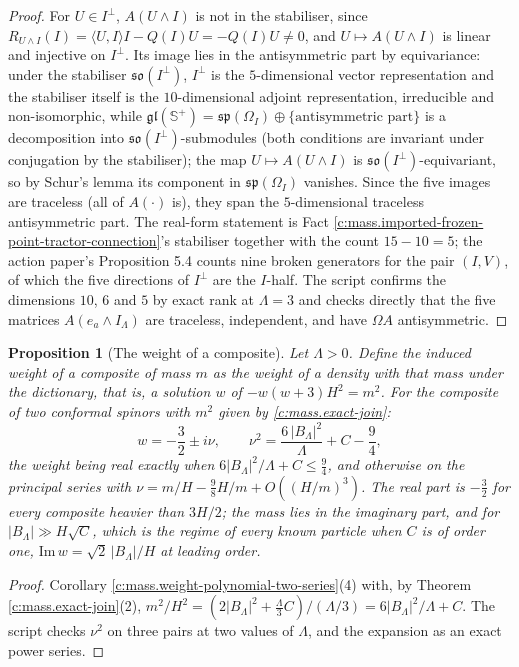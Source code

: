 \documentclass[11pt]{article}
\newtheorem{proposition}[theorem]{Proposition}
\theoremstyle{definition}
\theoremstyle{plain}
\newcommand{\changedmark}[2]{\marginpar{\raggedright\scriptsize\color{#1}#2}}
\providecommand{\CS}{}\renewcommand{\CS}{{\mathbb{S}^{+}}}
\providecommand{\ip}{}\renewcommand{\ip}[2]{\langle #1, #2\rangle}
\begin{document}
\begin{proof}
For $U \in I^{\perp}$, $A(U\wedge I)$ is not in the stabiliser, since $R_{U\wedge I}(I) = \ip{U}{I}I - Q(I)U = -Q(I)U \neq 0$, and $U \mapsto A(U\wedge I)$ is linear and injective on $I^{\perp}$. Its image lies in the antisymmetric part by equivariance: under the stabiliser $\mathfrak{so}(I^{\perp})$, $I^{\perp}$ is the $5$-dimensional vector representation and the stabiliser itself is the $10$-dimensional adjoint representation, irreducible and non-isomorphic, while $\mathfrak{gl}(\CS) = \mathfrak{sp}(\Omega_{I}) \oplus \{\text{antisymmetric part}\}$ is a decomposition into $\mathfrak{so}(I^{\perp})$-submodules (both conditions are invariant under conjugation by the stabiliser); the map $U \mapsto A(U\wedge I)$ is $\mathfrak{so}(I^{\perp})$-equivariant, so by Schur's lemma its component in $\mathfrak{sp}(\Omega_{I})$ vanishes. Since the five images are traceless (all of $A(\cdot)$ is), they span the $5$-dimensional traceless antisymmetric part. The real-form statement is Fact \ref{c:mass.imported-frozen-point-tractor-connection}'s stabiliser together with the count $15 - 10 = 5$; the action paper's Proposition 5.4 counts nine broken generators for the pair $(I, V)$, of which the five directions of $I^{\perp}$ are the $I$-half. The script confirms the dimensions $10$, $6$ and $5$ by exact rank at $\Lambda = 3$ and checks directly that the five matrices $A(e_{a}\wedge I_{\Lambda})$ are traceless, independent, and have $\Omega A$ antisymmetric.

\end{proof}

\begin{proposition}[The weight of a composite]\label{c:mass.weight-composite}
\changedmark{gray}{reworded}
Let $\Lambda > 0$. Define the \emph{induced weight} of a composite of mass $m$ as the weight of a density with that mass under the dictionary, that is, a solution $w$ of $-w(w+3)H^{2} = m^{2}$. For the composite of two conformal spinors with $m^{2}$ given by \ref{c:mass.exact-join}:
\begin{equation}
w = -\frac32 \pm i\nu, \qquad \nu^{2} = \frac{6\,|B_{\Lambda}|^{2}}{\Lambda} + C - \frac94,
\end{equation}
the weight being real exactly when $6|B_{\Lambda}|^{2}/\Lambda + C \le \tfrac94$, and otherwise on the principal series with $\nu = m/H - \tfrac98 H/m + O((H/m)^{3})$. The real part is $-\tfrac32$ for every composite heavier than $3H/2$; the mass lies in the imaginary part, and for $|B_{\Lambda}| \gg H\sqrt{C}$, which is the regime of every known particle when $C$ is of order one, $\mathrm{Im}\,w = \sqrt{2}\,|B_{\Lambda}|/H$ at leading order.
\end{proposition}
\begin{proof}
Corollary \ref{c:mass.weight-polynomial-two-series}(4) with, by Theorem \ref{c:mass.exact-join}(2), $m^{2}/H^{2} = (2|B_{\Lambda}|^{2} + \tfrac{\Lambda}{3}C)/(\Lambda/3) = 6|B_{\Lambda}|^{2}/\Lambda + C$. The script checks $\nu^{2}$ on three pairs at two values of $\Lambda$, and the expansion as an exact power series.

\end{proof}
\end{document}
